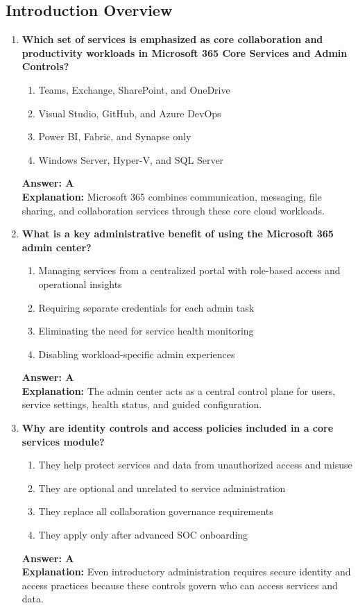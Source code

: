 \documentclass[10pt]{article}
\begin{document}
\subsection{Introduction Overview}
\begin{enumerate}[leftmargin=*]

\item \textbf{Which set of services is emphasized as core collaboration and productivity workloads in Microsoft 365 Core Services and Admin Controls?}
\begin{enumerate}[label=\Alph*.]
  \item Teams, Exchange, SharePoint, and OneDrive
  \item Visual Studio, GitHub, and Azure DevOps
  \item Power BI, Fabric, and Synapse only
  \item Windows Server, Hyper-V, and SQL Server
\end{enumerate}
\textbf{Answer: A}\\
\textbf{Explanation:} Microsoft 365 combines communication, messaging, file sharing, and collaboration services through these core cloud workloads.

\item \textbf{What is a key administrative benefit of using the Microsoft 365 admin center?}
\begin{enumerate}[label=\Alph*.]
  \item Managing services from a centralized portal with role-based access and operational insights
  \item Requiring separate credentials for each admin task
  \item Eliminating the need for service health monitoring
  \item Disabling workload-specific admin experiences
\end{enumerate}
\textbf{Answer: A}\\
\textbf{Explanation:} The admin center acts as a central control plane for users, service settings, health status, and guided configuration.

\item \textbf{Why are identity controls and access policies included in a core services module?}
\begin{enumerate}[label=\Alph*.]
  \item They help protect services and data from unauthorized access and misuse
  \item They are optional and unrelated to service administration
  \item They replace all collaboration governance requirements
  \item They apply only after advanced SOC onboarding
\end{enumerate}
\textbf{Answer: A}\\
\textbf{Explanation:} Even introductory administration requires secure identity and access practices because these controls govern who can access services and data.


\end{enumerate}
\end{document}
